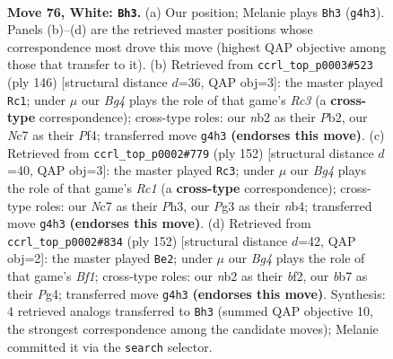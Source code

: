 \documentclass[11pt]{article}
\begin{document}
\clearpage

\begin{figure}[p]\centering
\begin{subfigure}{0.46\textwidth}\centering
\resizebox{\linewidth}{!}{%
\newchessgame
\chessboard[
  setfen={8/PbNR4/6k1/8/1p3PB1/6P1/1n2K2P/8 w - - 20 76},
  showmover=false,
  pgfstyle=straightmove, color=movearrow, markmove={g4-h3}
]}
\caption{}
\end{subfigure}\hfill
\begin{subfigure}{0.46\textwidth}\centering
\resizebox{\linewidth}{!}{%
\newchessgame
\chessboard[
  setfen={3k4/3b1pn1/6p1/4P3/5P1P/2R2K2/1P6/8 w - - 29 74},
  showmover=false,
  pgfstyle=straightmove, color=movearrow, markmove={c3-c1}
]}
\caption{}
\end{subfigure}
\\[4pt]
\begin{subfigure}{0.46\textwidth}\centering
\resizebox{\linewidth}{!}{%
\newchessgame
\chessboard[
  setfen={8/3r3p/6p1/6B1/1n6/7P/4k1P1/2R3K1 w - - 26 77},
  showmover=false,
  pgfstyle=straightmove, color=movearrow, markmove={c1-c3}
]}
\caption{}
\end{subfigure}\hfill
\begin{subfigure}{0.46\textwidth}\centering
\resizebox{\linewidth}{!}{%
\newchessgame
\chessboard[
  setfen={8/k7/5p1p/PK5P/6P1/8/5b2/5B2 w - - 29 77},
  showmover=false,
  pgfstyle=straightmove, color=movearrow, markmove={f1-e2}
]}
\caption{}
\end{subfigure}
\caption{\textbf{Move 76, White: \texttt{Bh3}.} (a) Our position; Melanie plays \texttt{Bh3} (\texttt{g4h3}). Panels (b)--(d) are the retrieved master positions whose correspondence most drove this move (highest QAP objective among those that transfer to it). (b) Retrieved from \texttt{ccrl\_top\_p0003\#523} (ply 146) [structural distance $d$=36, QAP obj=3]: the master played \texttt{Rc1}; under $\mu$ our \emph{Bg4} plays the role of that game's \emph{Rc3} (a \textbf{cross-type} correspondence); cross-type roles: our \emph{n}b2 as their \emph{P}b2, our \emph{N}c7 as their \emph{P}f4; transferred move \texttt{g4h3} \textbf{(endorses this move)}. (c) Retrieved from \texttt{ccrl\_top\_p0002\#779} (ply 152) [structural distance $d$=40, QAP obj=3]: the master played \texttt{Rc3}; under $\mu$ our \emph{Bg4} plays the role of that game's \emph{Rc1} (a \textbf{cross-type} correspondence); cross-type roles: our \emph{N}c7 as their \emph{P}h3, our \emph{P}g3 as their \emph{n}b4; transferred move \texttt{g4h3} \textbf{(endorses this move)}. (d) Retrieved from \texttt{ccrl\_top\_p0002\#834} (ply 152) [structural distance $d$=42, QAP obj=2]: the master played \texttt{Be2}; under $\mu$ our \emph{Bg4} plays the role of that game's \emph{Bf1}; cross-type roles: our \emph{n}b2 as their \emph{b}f2, our \emph{b}b7 as their \emph{P}g4; transferred move \texttt{g4h3} \textbf{(endorses this move)}. Synthesis: 4 retrieved analogs transferred to \texttt{Bh3} (summed QAP objective 10, the strongest correspondence among the candidate moves); Melanie committed it via the \texttt{search} selector.}
\label{fig:thought-m150}
\end{figure}
\end{document}
